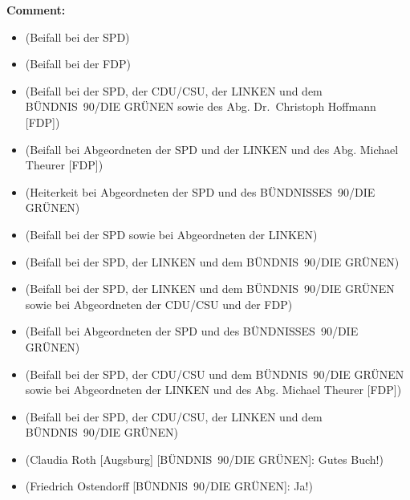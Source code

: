 \documentclass{article}
\begin{document}
\noindent\textbf{Comment:}
\begin{itemize}
    \setlength\itemsep{-3pt}
    \item (Beifall bei der SPD)
    \setlength\itemsep{-3pt}
    \item (Beifall bei der FDP)
    \setlength\itemsep{-3pt}
    \item (Beifall bei der SPD, der CDU/CSU, der LINKEN und dem BÜNDNIS 90/DIE GRÜNEN sowie des Abg. Dr. Christoph Hoffmann [FDP])
    \setlength\itemsep{-3pt}
    \item (Beifall bei Abgeordneten der SPD und der LINKEN und des Abg. Michael Theurer [FDP])
    \setlength\itemsep{-3pt}
    \item (Heiterkeit bei Abgeordneten der SPD und des BÜNDNISSES 90/DIE GRÜNEN)
    \setlength\itemsep{-3pt}
    \item (Beifall bei der SPD sowie bei Abgeordneten der LINKEN)
    \setlength\itemsep{-3pt}
    \item (Beifall bei der SPD, der LINKEN und dem BÜNDNIS 90/DIE GRÜNEN)
    \setlength\itemsep{-3pt}
    \item (Beifall bei der SPD, der LINKEN und dem BÜNDNIS 90/DIE GRÜNEN sowie bei Abgeordneten der CDU/CSU und der FDP)
    \setlength\itemsep{-3pt}
    \item (Beifall bei Abgeordneten der SPD und des BÜNDNISSES 90/DIE GRÜNEN)
    \setlength\itemsep{-3pt}
    \item (Beifall bei der SPD, der CDU/CSU und dem BÜNDNIS 90/DIE GRÜNEN sowie bei Abgeordneten der LINKEN und des Abg. Michael Theurer [FDP])
    \setlength\itemsep{-3pt}
    \item (Beifall bei der SPD, der CDU/CSU, der LINKEN und dem BÜNDNIS 90/DIE GRÜNEN)
    \setlength\itemsep{-3pt}
    \item (Claudia Roth [Augsburg] [BÜNDNIS 90/DIE GRÜNEN]: Gutes Buch!)
    \setlength\itemsep{-3pt}
    \item (Friedrich Ostendorff [BÜNDNIS 90/DIE GRÜNEN]: Ja!)
\end{itemize}
\end{document}
